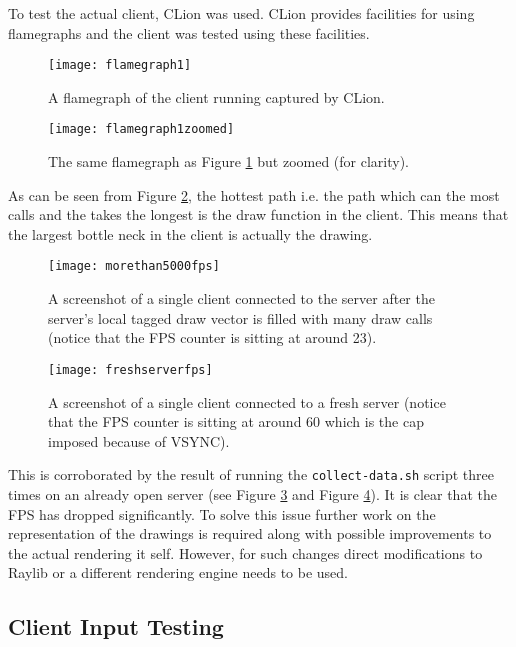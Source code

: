 \documentclass[article]{uom-coursework}
\begin{document}
To test the actual client, CLion was used. CLion provides
facilities for using flamegraphs and the client was tested using
these facilities.

\begin{figure}[H]
\centering
\texttt{[image: flamegraph1]}
\caption{A flamegraph of the client running captured by CLion.}
\label{fig:flamegraph}
\end{figure}

\begin{figure}[H]
\centering
\texttt{[image: flamegraph1zoomed]}
\caption{The same flamegraph as Figure \ref{fig:flamegraph} but zoomed (for clarity).}
\label{fig:flamegraphzoomed}
\end{figure}

As can be seen from Figure \ref{fig:flamegraphzoomed}, the
hottest path i.e. the path which can the most calls and the
takes the longest is the draw function in the client. This means
that the largest bottle neck in the client is actually the
drawing.

\begin{figure}[H]
\centering
\texttt{[image: morethan5000fps]}
\caption{A screenshot of a single client connected
to the server after the server's local tagged draw vector is
filled with many draw calls (notice that the FPS counter is sitting
at around 23).}
\label{fig:stressedclient}
\end{figure}

\begin{figure}[H]
\centering
\texttt{[image: freshserverfps]}
\caption{A screenshot of a single client connected to a fresh
server (notice that the FPS counter is sitting at around 60
which is the cap imposed because of VSYNC).}
\label{fig:freshclient}
\end{figure}

This is corroborated by the result of running the
\texttt{collect-data.sh} script three times on an already open
server (see Figure \ref{fig:stressedclient} and Figure
\ref{fig:freshclient}). It is clear that the FPS has dropped
significantly. To solve this issue further work on the
representation of the drawings is required along with possible
improvements to the actual rendering it self. However, for such
changes direct modifications to Raylib or a different rendering
engine needs to be used.

\subsection{Client Input Testing}
\end{document}
